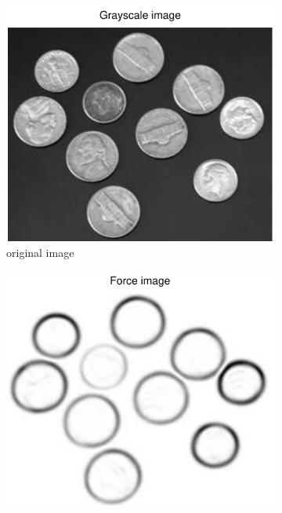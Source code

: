 \documentclass[11pt,a4paper]{article}
\begin{document}
\begin{figure}[H]
    \centering
    \begin{subfigure}[t]{0.21\textwidth}
        \includegraphics[width=\textwidth]{src/images/coins_gradient_gray.pdf}
        \caption{original image}
        \label{fig:coins_original}
    \end{subfigure}
    \begin{subfigure}[t]{0.21\textwidth}
        \includegraphics[width=\textwidth]{src/images/coins_gradient_forces.pdf}

\end{subfigure}
\end{figure}
\end{document}
